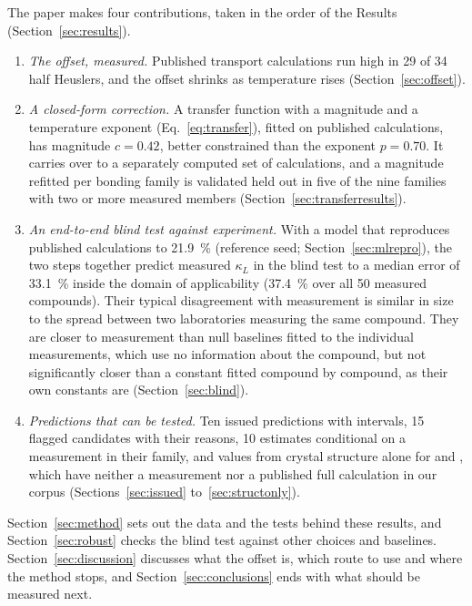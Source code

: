 The paper makes four contributions, taken in the order of the Results
(Section~\ref{sec:results}).
%
\begin{enumerate}[label=(\roman*), itemsep=1pt, topsep=3pt, leftmargin=2.2em]
  \item \emph{The offset, measured.} Published transport calculations run high in \num{29} of
        \num{34} half Heuslers, and the offset shrinks as temperature rises
        (Section~\ref{sec:offset}).
  \item \emph{A closed-form correction.} A transfer function with a magnitude and a temperature
        exponent (Eq.~\eqref{eq:transfer}), fitted on published calculations, has magnitude
        $c = \num{0.42}$, better constrained than the exponent $p = \num{0.70}$. It carries over
        to a separately computed set of calculations, and a magnitude refitted per bonding family
        is validated held out in five of the nine families with two or more measured members
        (Section~\ref{sec:transferresults}).
  \item \emph{An end-to-end blind test against experiment.} With a model that reproduces published
        calculations to \SI{21.9}{\percent} (reference seed; Section~\ref{sec:mlrepro}), the two
        steps together predict measured $\kappa_L$ in the blind test to a median error of
        \SI{33.1}{\percent} inside the domain of applicability (\SI{37.4}{\percent} over all
        \num{50} measured compounds). Their typical disagreement with measurement is similar in
        size to the spread between two laboratories measuring the same compound. They are closer
        to measurement than null baselines fitted to the individual measurements, which use no
        information about the compound, but not significantly closer than a constant fitted
        compound by compound, as their own constants are (Section~\ref{sec:blind}).
  \item \emph{Predictions that can be tested.} Ten issued predictions with intervals, \num{15}
        flagged candidates with their reasons, \num{10} estimates conditional on a measurement in
        their family, and values from crystal structure alone for  and , which have neither a measurement nor a published full calculation in our corpus (Sections~\ref{sec:issued}
        to~\ref{sec:structonly}).
\end{enumerate}

Section~\ref{sec:method} sets out the data and the tests behind these results, and
Section~\ref{sec:robust} checks the blind test against other choices and baselines.
Section~\ref{sec:discussion} discusses what the offset is, which route to use and where the method
stops, and Section~\ref{sec:conclusions} ends with what should be measured next.
